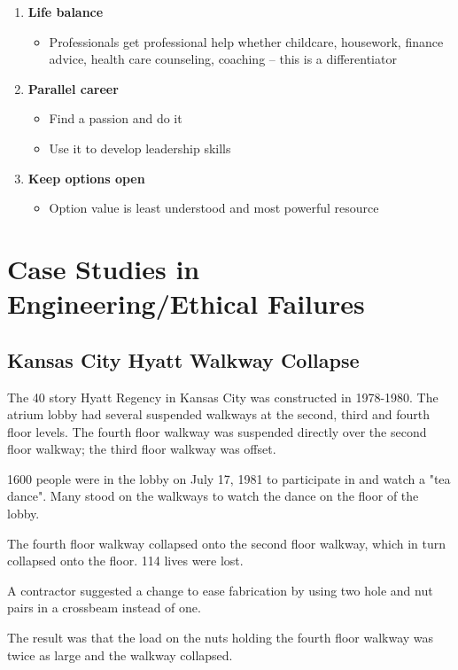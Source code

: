 \documentclass{article}
\begin{document}
\begin{enumerate}
\begin{itemize}
\end{itemize}
\item \textbf{Life balance} \begin{itemize}
\item Professionals get professional help  whether childcare, housework, finance advice, health care counseling, coaching -- this is a differentiator
\end{itemize}
\item \textbf{Parallel career} \begin{itemize}
\item Find a passion and do it
\item Use it to develop leadership skills
\end{itemize}
\item \textbf{Keep options open} \begin{itemize}
\item Option value is least understood and most powerful resource 
\end{itemize}
\end{enumerate}

\section{Case Studies in Engineering/Ethical Failures}

\subsection{Kansas City Hyatt Walkway Collapse}

The 40 story Hyatt Regency in Kansas City was constructed in 1978-1980. The atrium lobby had several suspended walkways at the second, third and fourth floor levels. The fourth floor walkway was suspended directly over the second floor walkway; the third floor walkway was offset. 

1600 people were in the lobby on July 17, 1981 to participate in and watch a "tea dance". Many stood on the walkways to watch the dance on the floor of the lobby.

 The fourth floor walkway collapsed onto the second floor walkway, which in turn collapsed onto the floor.  114 lives were lost.

A contractor suggested a change to ease fabrication  by using two hole and nut pairs in a crossbeam instead of one.

The result was that the load on the nuts holding the fourth floor walkway was twice as large and the walkway collapsed.
\end{document}
